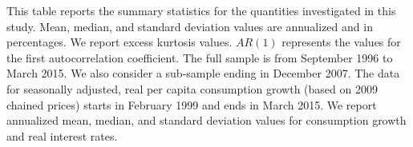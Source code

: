 \documentclass[11pt]{article}
\begin{document}
\begin{table}
\noindent \scriptsize This table reports the summary statistics for the quantities investigated in this study. Mean, median, and standard deviation values are annualized and in percentages. We report excess kurtosis values. $AR(1)$ represents the values for the first autocorrelation coefficient. The full sample is from September 1996 to March 2015. We also consider a sub-sample ending in December 2007. The data for seasonally adjusted, real per capita consumption growth (based on 2009 chained prices) starts in February 1999 and ends in March 2015. We report annualized mean, median, and standard deviation values for consumption growth and real interest rates.

\end{table}

%
\end{document}
